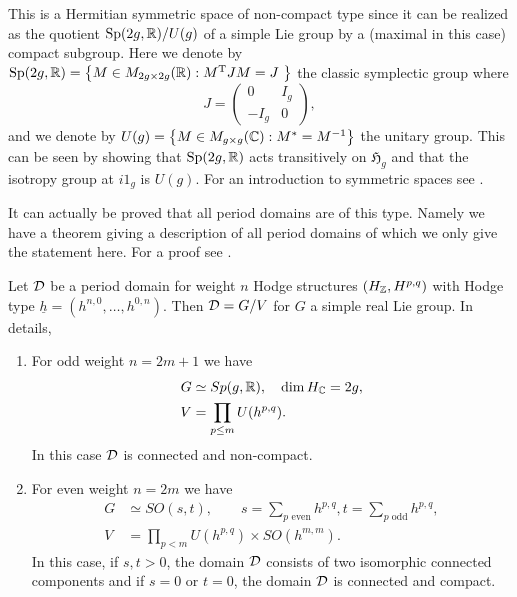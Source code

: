 \documentclass[../main.tex]{subfiles}
\begin{document}
\begin{es}
This is a Hermitian symmetric space of non-compact type since it can be realized as the quotient $\operatorname {Sp}(2g,\mathbb{R}) / U(g)$ of a simple Lie group by a (maximal in this case) compact subgroup. Here we denote by $\operatorname {Sp}(2g,\mathbb{R}) = \left\{ M\in M_{2g\times 2g}(\mathbb{R}):M^{\mathrm {T} } J M=J \ \right\}$ the classic symplectic group where 
\[ 
J =\left( \begin{array}{cc} 0 & I_g \\ -I_g & 0 \end{array} \right),
\] and we denote by $U(g) = \left \{
 M\in M_{g\times g}(\mathbb{C}): M^* =M^{-1} \right\}$ the unitary group. This can be seen by showing that $\operatorname {Sp}(2g, \mathbb{R})$ acts transitively on $\mathfrak{H}_g$ and that the isotropy group at $i1_g$ is $U(g)$. For an introduction to symmetric spaces see \cite{Hel64}.
\end{es}

\begin{rem}
    It can actually be proved that all period domains are of this type. Namely we have a theorem giving a description of all  period domains of which we only give the statement here. For a proof see  \cite[Thm. 4.4.4]{CMSP03}.
    
    \begin{theorem}
        Let $\mathcal{D}$ be a period domain for weight $n$ Hodge structures $(H_{\mathbb{Z}},H^{p,q})$ with Hodge type  $\underline{h} = (h^{n,0}, \dots , h^{0,n})$. Then $\mathcal{D}= G / V$ for $G$ a simple real Lie group.
        In details,
        \begin{enumerate}
            \item  For odd weight $n = 2m + 1$ we have
            \begin{align*}
                G &\simeq Sp(g, \mathbb{R}), \quad \dim H_{\mathbb{C}} = 2g, \\
V &= \prod_{p\leq m} U(h^{p,q}).
            \end{align*}
In this case $\mathcal{D}$ is connected and non-compact.
\item For even weight $n = 2m$ we have
\begin{align*}
G &\simeq SO(s, t), \qquad s =\sum_{p \text{  even} }h^{p,q}, t =\sum_{p \text{ odd} } h^{p,q},  \\
V &= \prod_{p<m} U(h^{p,q}) \times SO(h^{m,m}).
\end{align*}
In this case, if $s, t > 0$, the domain $\mathcal{D}$ consists of two isomorphic connected components and if $s = 0 \text{ or } t = 0$, the domain $\mathcal{D}$ is connected and compact.
        \end{enumerate}
    \end{theorem}
\end{rem}
\end{document}
